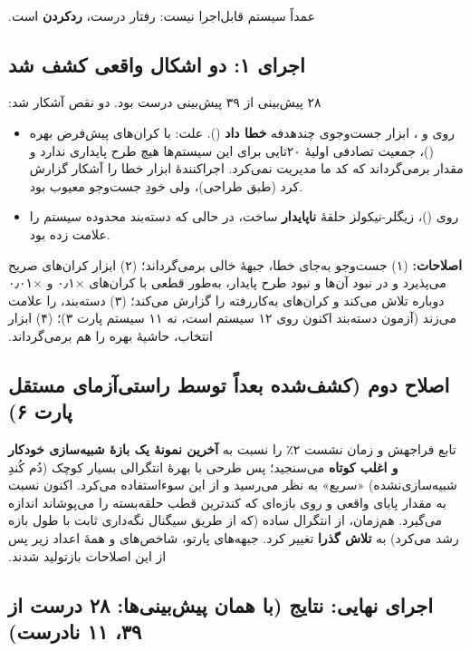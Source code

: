 ‫\documentclass[a4paper,12pt]{article}
\begin{document}
‫ عمداً سیستم قابل‌اجرا نیست: رفتار درست، \textbf{رد‌کردن} است.
‫
‫\subsection{اجرای ۱: دو اشکال واقعی کشف شد}
‫۲۸ پیش‌بینی از ۳۹ پیش‌بینی درست بود. دو نقص آشکار شد:
‫\begin{itemize}
‫\item روی  و ، ابزار جست‌وجوی چندهدفه \textbf{خطا داد} (\texttt{}). علت: با کران‌های پیش‌فرض بهره ()، جمعیت تصادفی اولیهٔ ۲۰تایی برای این سیستم‌ها هیچ طرح پایداری ندارد و  مقدار \texttt{} برمی‌گرداند که کد ما مدیریت نمی‌کرد. اجراکنندهٔ ابزار خطا را آشکار گزارش کرد (طبق طراحی)، ولی خودِ جست‌وجو معیوب بود.
‫\item روی  ()،  زیگلر-نیکولز حلقهٔ \textbf{ناپایدار} ساخت، در حالی که دسته‌بند محدوده سیستم را  علامت زده بود.
‫\end{itemize}
‫\textbf{اصلاحات:} (۱) جست‌وجو به‌جای خطا، جبههٔ خالی برمی‌گرداند؛ (۲) ابزار کران‌های صریح می‌پذیرد و در نبود آن‌ها و نبود طرح پایدار، به‌طور قطعی با کران‌های ×۰٫۱ و ×۰٫۰۱ دوباره تلاش می‌کند و کران‌های به‌کاررفته را گزارش می‌کند؛ (۳) دسته‌بند،  را  علامت می‌زند (آزمون دسته‌بند اکنون روی ۱۲ سیستم است، نه ۱۱ سیستم پارت ۳)؛ (۴) ابزار انتخاب، حاشیهٔ بهره را هم برمی‌گرداند.
‫
‫\subsection{اصلاح دوم (کشف‌شده بعداً توسط راستی‌آزمای مستقل پارت ۶)}
‫تابع \texttt{} فراجهش و زمان نشست ۲٪ را نسبت به \textbf{آخرین نمونهٔ یک بازهٔ شبیه‌سازی خودکار و اغلب کوتاه} می‌سنجید؛ پس طرحی با بهرهٔ انتگرالی بسیار کوچک (دُم کُندِ شبیه‌سازی‌نشده) «سریع» به نظر می‌رسید و  از این سوءاستفاده می‌کرد. اکنون نسبت به مقدار پایای واقعی و روی بازه‌ای که کندترین قطب حلقه‌بسته را می‌پوشاند اندازه می‌گیرد. هم‌زمان، \texttt{} از انتگرال ساده  (که از طریق سیگنال نگه‌داری ثابت با طول بازه رشد می‌کرد) به \textbf{تلاش گذرا}  تغییر کرد. جبهه‌های پارتو، شاخص‌های  و همهٔ اعداد زیر پس از این اصلاحات بازتولید شدند.
‫
‫\subsection{اجرای نهایی: نتایج (با همان پیش‌بینی‌ها: ۲۸ درست از ۳۹، ۱۱ نادرست)}
\end{document}
